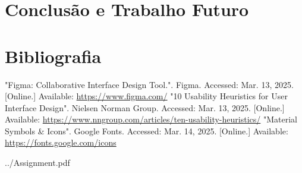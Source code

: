 \documentclass[12pt, a4paper]{article}
\begin{document}
\section{Conclusão e Trabalho Futuro}

\begingroup
\section{Bibliografia}
\renewcommand{\section}[2]{}

\begin{thebibliography}{9}
        "Figma: Collaborative Interface Design Tool."{}. Figma. Accessed: Mar. 13, 2025. [Online.]
        Available: \url{https://www.figma.com/}
        "10 Usability Heuristics for User Interface Design". Nielsen Norman Group.
        Accessed: Mar. 13, 2025. [Online.] Available:
        \url{https://www.nngroup.com/articles/ten-usability-heuristics/}
        "Material Symbols \& Icons"{}. Google Fonts. Accessed: Mar. 14, 2025. [Online.] Available:
        \url{https://fonts.google.com/icons}
\end{thebibliography}
\endgroup


    {../Assignment.pdf}

\end{document}
